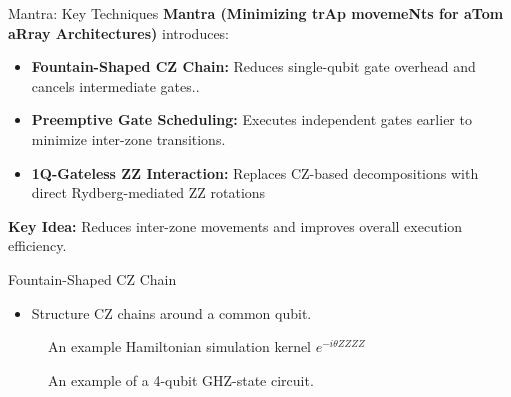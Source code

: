 \documentclass{beamer}
\begin{document}
	\begin{frame}{Mantra: Key Techniques}
		\textbf{Mantra (Minimizing trAp movemeNts for aTom aRray Architectures)} introduces:
		\begin{itemize}
			\item \textbf{Fountain-Shaped CZ Chain:} Reduces single-qubit gate overhead and cancels intermediate gates..
			\item \textbf{Preemptive Gate Scheduling:} Executes independent gates earlier to minimize inter-zone transitions.
			\item \textbf{1Q-Gateless ZZ Interaction:} Replaces CZ-based decompositions with direct Rydberg-mediated ZZ rotations
		\end{itemize}
		\textbf{Key Idea:} Reduces inter-zone movements and improves overall execution efficiency.
	\end{frame}
	
	\begin{frame}{Fountain-Shaped CZ Chain}
		\begin{itemize}
			\item Structure CZ chains around a common qubit.
		\end{itemize}
		\centering
		\begin{figure}
		\caption[]{An example Hamiltonian simulation kernel $e^{-i\theta ZZZZ}$}
		\end{figure}
		\begin{figure}
			\caption[]{An example of a 4-qubit GHZ-state circuit.}
		\end{figure}
	\end{frame}
	
\end{document}
